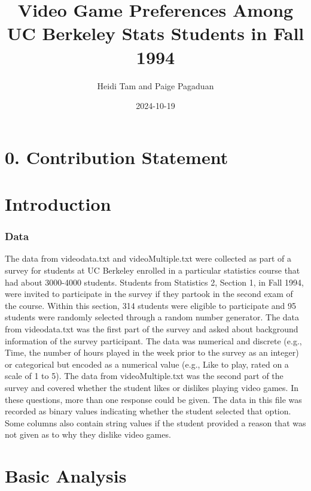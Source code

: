 \documentclass[
]{article}
\title{Video Game Preferences Among UC Berkeley Stats Students in Fall
1994}
\author{Heidi Tam and Paige Pagaduan}
\date{2024-10-19}
\begin{document}
\maketitle

\hypertarget{contribution-statement}{%
\section{0. Contribution Statement}\label{contribution-statement}}

\pagebreak


\hypertarget{introduction}{%
\section{Introduction}\label{introduction}}

\hypertarget{data}{%
\subsubsection{Data}\label{data}}

The data from videodata.txt and videoMultiple.txt were collected as part
of a survey for students at UC Berkeley enrolled in a particular
statistics course that had about 3000-4000 students. Students from
Statistics 2, Section 1, in Fall 1994, were invited to participate in
the survey if they partook in the second exam of the course. Within this
section, 314 students were eligible to participate and 95 students were
randomly selected through a random number generator. The data from
videodata.txt was the first part of the survey and asked about
background information of the survey participant. The data was numerical
and discrete (e.g., Time, the number of hours played in the week prior
to the survey as an integer) or categorical but encoded as a numerical
value (e.g., Like to play, rated on a scale of 1 to 5). The data from
videoMultiple.txt was the second part of the survey and covered whether
the student likes or dislikes playing video games. In these questions,
more than one response could be given. The data in this file was
recorded as binary values indicating whether the student selected that
option. Some columns also contain string values if the student provided
a reason that was not given as to why they dislike video games.

\pagebreak

\hypertarget{basic-analysis}{%
\section{Basic Analysis}\label{basic-analysis}}
\end{document}
